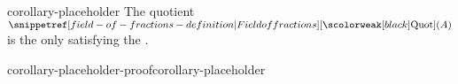 \documentclass[preview]{standalone}
\begin{document}
\begin{snippetcorollary}{corollary-placeholder}{}
    The quotient \(\quotientfield(A)\) is the only \field satisfying
    the .
\end{snippetcorollary}

\begin{snippetproof}{corollary-placeholder-proof}{corollary-placeholder}{}
    \begin{center}
    \end{center}
    \todo %
\end{snippetproof}
\end{document}
